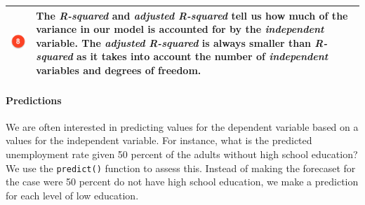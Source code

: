 \documentclass[]{article}
\let\oldparagraph\paragraph
\renewcommand{\paragraph}[1]{\oldparagraph{#1}\mbox{}}
\begin{document}
\begin{longtable}[]{@{}ll@{}}
\begin{minipage}[t]{0.07\columnwidth}
\includegraphics[width=1\textwidth,height=\textheight]{./img/circle8.png}\strut
\end{minipage} & \begin{minipage}[t]{0.87\columnwidth}\raggedright
The \emph{R-squared} and \emph{adjusted R-squared} tell us how much of the variance in our model is accounted for by the \emph{independent} variable. The \emph{adjusted R-squared} is always smaller than \emph{R-squared} as it takes into account the number of \emph{independent} variables and degrees of freedom.\strut
\end{minipage}\tabularnewline
\bottomrule
\end{longtable}

\hypertarget{predictions}{%
\paragraph{Predictions}\label{predictions}}

We are often interested in predicting values for the dependent variable based on a values for the independent variable. For instance, what is the predicted unemployment rate given 50 percent of the adults without high school education? We use the \texttt{predict()} function to assess this. Instead of making the forecaset for the case were 50 percent do not have high school education, we make a prediction for each level of low education.
\end{document}
